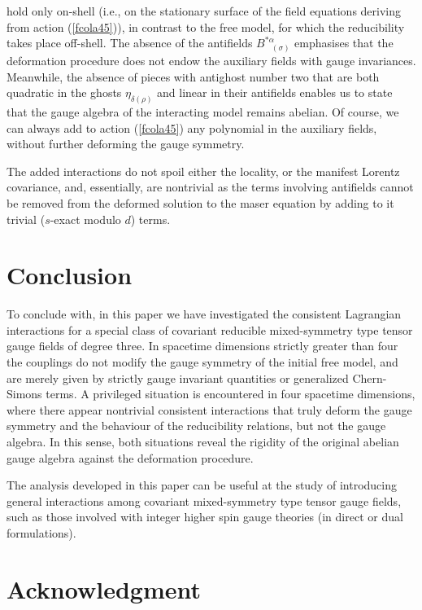 \documentclass[a4paper,12pt]{article}
\begin{document}
hold only on-shell (i.e., on the stationary surface of the field equations
deriving from action (\ref{fcola45})), in contrast to the free model, for
which the reducibility takes place off-shell. The absence of the antifields $%
B_{\;\;\;(\sigma )}^{*\alpha }$ emphasises that the deformation procedure
does not endow the auxiliary fields with gauge invariances. Meanwhile, the
absence of pieces with antighost number two that are both quadratic in the
ghosts $\eta _{\delta (\rho )}$ and linear in their antifields enables us to
state that the gauge algebra of the interacting model remains abelian. Of
course, we can always add to action (\ref{fcola45}) any polynomial in the
auxiliary fields, without further deforming the gauge symmetry.

The added interactions do not spoil either the locality, or the manifest
Lorentz covariance, and, essentially, are nontrivial as the terms involving
antifields cannot be removed from the deformed solution to the maser
equation by adding to it trivial ($s$-exact modulo $d$) terms.

\section{Conclusion}

To conclude with, in this paper we have investigated the consistent
Lagrangian interactions for a special class of covariant reducible
mixed-symmetry type tensor gauge fields of degree three. In spacetime
dimensions strictly greater than four the couplings do not modify the gauge
symmetry of the initial free model, and are merely given by strictly gauge
invariant quantities or generalized Chern-Simons terms. A privileged
situation is encountered in four spacetime dimensions, where there appear
nontrivial consistent interactions that truly deform the gauge symmetry and
the behaviour of the reducibility relations, but not the gauge algebra. In
this sense, both situations reveal the rigidity of the original abelian
gauge algebra against the deformation procedure.

The analysis developed in this paper can be useful at the study of
introducing general interactions among covariant mixed-symmetry type tensor
gauge fields, such as those involved with integer higher spin gauge theories
(in direct or dual formulations).

\section*{Acknowledgment}
\end{document}
